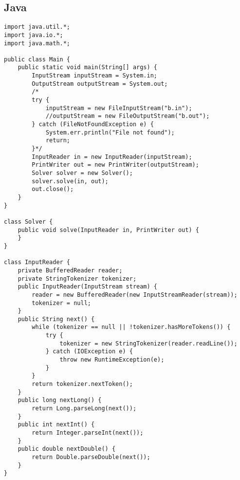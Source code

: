 \subsection{Java}
\begin{verbatim}
import java.util.*;
import java.io.*;
import java.math.*;

public class Main {
    public static void main(String[] args) {
        InputStream inputStream = System.in;
        OutputStream outputStream = System.out;
        /*
        try {
            inputStream = new FileInputStream("b.in");
            //outputStream = new FileOutputStream("b.out");
        } catch (FileNotFoundException e) {
            System.err.println("File not found");
            return;
        }*/
        InputReader in = new InputReader(inputStream);
        PrintWriter out = new PrintWriter(outputStream);
        Solver solver = new Solver();
        solver.solve(in, out);
        out.close();
    }
}

class Solver {
    public void solve(InputReader in, PrintWriter out) {
    }
}

class InputReader {
    private BufferedReader reader;
    private StringTokenizer tokenizer;
    public InputReader(InputStream stream) {
        reader = new BufferedReader(new InputStreamReader(stream));
        tokenizer = null;
    }
    public String next() {
        while (tokenizer == null || !tokenizer.hasMoreTokens()) {
            try {
                tokenizer = new StringTokenizer(reader.readLine());
            } catch (IOException e) {
                throw new RuntimeException(e);
            }
        }
        return tokenizer.nextToken();
    }
    public long nextLong() {
        return Long.parseLong(next());
    }
    public int nextInt() {
        return Integer.parseInt(next());
    }
    public double nextDouble() {
        return Double.parseDouble(next());
    }
}
\end{verbatim}
